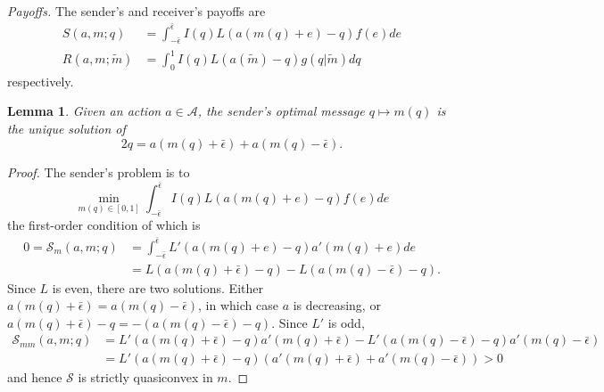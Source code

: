 \documentclass[12pt]{article}
\newtheorem{lemma}{Lemma}
\begin{document}
\noindent\textit{Payoffs.} The sender's and receiver's payoffs are 
\begin{align}
S(a,m;q)&=\int_{-\bar{\epsilon}}^{\bar{\epsilon}}{I(q)L(a(m(q)+e)-q)f(e)de}\\
R(a,m;\tilde{m})&=\int_{0}^{1}{I(q)L(a(\tilde{m})-q)g(q|\tilde{m})dq}
\end{align}
respectively.

\begin{lemma}\label{lemma:message}
Given an action $a\in\mathcal{A}$, the sender's optimal message $q\mapsto m(q)$ is the unique solution of
\begin{equation}
2q=a(m(q)+\bar{\epsilon})+a(m(q)-\bar{\epsilon}).
\end{equation}
\end{lemma}
\begin{proof}
The sender's problem is to
\begin{equation}
\min_{m(q)\in[0,1]}\int_{-\bar{\epsilon}}^{\bar{\epsilon}}{I(q)L(a(m(q)+e)-q)f(e)de}
\end{equation}
the first-order condition of which is
\begin{align}
0=\mathcal{S}_{m}(a,m;q)&=\int_{-\bar{\epsilon}}^{\bar{\epsilon}}{L'(a(m(q)+e)-q)a'(m(q)+e)de}\\
&=L(a(m(q)+\bar{\epsilon})-q)-L(a(m(q)-\bar{\epsilon})-q).
\end{align}
Since $L$ is even, there are two solutions. Either $a(m(q)+\bar{\epsilon})=a(m(q)-\bar{\epsilon})$, in which case $a$ is decreasing, or $a(m(q)+\bar{\epsilon})-q=-(a(m(q)-\bar{\epsilon})-q)$. Since $L'$ is odd, 
\begin{align}
\mathcal{S}_{mm}(a,m;q)&=L'(a(m(q)+\bar{\epsilon})-q)a'(m(q)+\bar{\epsilon})-L'(a(m(q)-\bar{\epsilon})-q)a'(m(q)-\bar{\epsilon})\\
&=L'(a(m(q)+\bar{\epsilon})-q)(a'(m(q)+\bar{\epsilon})+a'(m(q)-\bar{\epsilon}))>0
\end{align}
and hence $\mathcal{S}$ is strictly quasiconvex in $m$. 
\end{proof}
\end{document}
